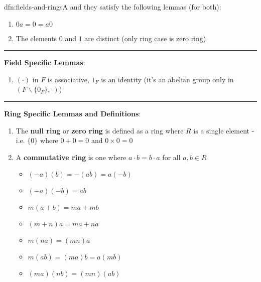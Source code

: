 \documentclass[landscape, 8pt]{extarticle}
\begin{document}
\begin{multicols}{3}
\begin{dfn}{dfn:fields-and-rings}{A}
    \vspace{-10pt}
    and they satisfy the following lemmas (for both):
    \begin{enumerate}
        \setlength\itemsep{0em}
        \item $0a = 0 = a 0$
        \item The elements $0$ and $1$ are distinct (only ring case is zero ring)
    \end{enumerate}

    \vspace{-5pt}
    \noindent\rule{\textwidth}{0.2pt}
    \textbf{Field Specific Lemmas}:
    \begin{enumerate}
        \setlength\itemsep{0em}
        \item $(\cdot)$ in $F$ is associative, $1_{F}$ is an identity (it's an abelian group only in $(F \backslash \{0_{F}\}, \cdot)$)
    \end{enumerate}
    
    \vspace{-5pt}
    \setlength{\columnseprule}{0pt}
    \noindent\rule{\textwidth}{0pt}
    \textbf{Ring Specific Lemmas and Definitions}:
    \begin{enumerate}
        \setlength\itemsep{0em}
        \item The \textbf{null ring} or \textbf{zero ring} is defined as a ring where $R$ is a single element - i.e. $\{0\}$ where $0 + 0 = 0$ and $0 \times 0 = 0$
        \item A \textbf{commutative ring} is one where $a \cdot b = b \cdot a$ for all $a,b\in R$
       \vspace{-15pt}
            \begin{multicols}{2}
                \begin{itemize}[leftmargin=*]
                    \item $(-a)(b) = -(ab) = a(-b)$
                    \item $(-a)(-b) = ab$
                    \item $m(a + b) = ma + mb$
                    \item $(m + n)a = ma + na$
                    \item $m(na) = (mn)a$
                    \item $m(ab) = (ma)b = a(mb)$
                    \item $(ma)(nb) = (mn)(ab)$
                \end{itemize}
            \end{multicols}
    \end{enumerate}
\end{dfn}


\end{multicols}
\end{document}
